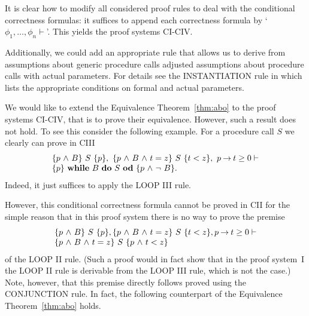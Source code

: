 \documentclass[manuscript, screen, review]{acmart}
\begin{document}
It is clear how to modify all considered proof rules to deal with the
conditional correctness formulas: it suffices to append each
correctness formula by `$\phi_1, \dots, \phi_n \vdash$'.  This yields
the proof systems CI-CIV.







Additionally, we could add an appropriate rule that allows us to
derive from assumptions about generic procedure calls adjusted
assumptions about procedure calls with actual parameters.  For details
see the INSTANTIATION rule in \cite[page 159]{ABO09} which lists the
appropriate conditions on formal and actual parameters.

We would like to extend the Equivalence Theorem~\ref{thm:abo} to the
proof systems CI-CIV, that is to prove their equivalence.  However,
such a result does not hold.  To see this consider the following
example.  For a procedure call $S$ we clearly can prove in CIII
\[
  \begin{array}{l}
    \mbox{$\{{p \mbox{$\ \wedge\ $} B}\}\ {S}\ \{{p}\}$}, \ \mbox{$\{{p \mbox{$\ \wedge\ $} B \mbox{$\ \wedge\ $} t=z}\}\ {S}\ \{{t<z}\}$}, \ p \mbox{$\:\rightarrow\:$} t \geq 0 \vdash \\
    \mbox{$\{{p}\}\ {\mbox{$\mbox{{\bf while}\ } {B}\ \mbox{{\bf do}\ } {S}\ \mbox{{\bf od}}$}}\ \{{p \mbox{$\ \wedge\ $} \neg\ B}\}$}.
  \end{array}
\]
Indeed, it just suffices to apply the LOOP III rule.

However, this conditional correctness formula cannot be proved in CII
for the simple reason that in this proof system there is no way to
prove the premise
\[
  \begin{array}{l}  
    \mbox{$\{{p \mbox{$\ \wedge\ $} B}\}\ {S}\ \{{p}\}$}, \mbox{$\{{p \mbox{$\ \wedge\ $} B \mbox{$\ \wedge\ $} t=z}\}\ {S}\ \{{t<z}\}$}, p \mbox{$\:\rightarrow\:$} t \geq 0 \vdash  \\
    \mbox{$\{{p \mbox{$\ \wedge\ $} B \mbox{$\ \wedge\ $} t=z}\}\ {S}\ \{{p \mbox{$\ \wedge\ $} t<z}\}$}
  \end{array}    
\]
of the LOOP II rule. (Such a proof would in fact show that in the
proof system~I the LOOP II rule is derivable from the LOOP III rule,
which is not the case.)  Note, however, that this premise directly
follows proved using the CONJUNCTION rule.
In fact, the following counterpart of the Equivalence Theorem~\ref{thm:abo}
holds.
\end{document}
